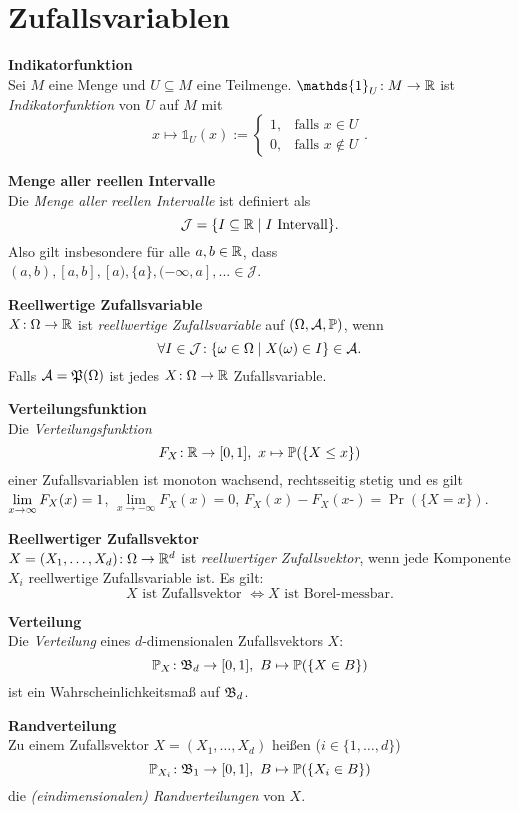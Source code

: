 \section{Zufallsvariablen}
\textbf{Indikatorfunktion}\\
Sei $M$ eine Menge und $U\subseteq M$ eine Teilmenge.
$\mathds{1}_U\!: M\to\R$ ist \textit{Indikatorfunktion} von $U$ auf $M$ mit
\[
  x\mapsto\mathds{1}_U(x):=\begin{cases} 1, & \text{falls }x\in U \\ 0, & \text{falls }x\notin U \end{cases}.
\]

\textbf{Menge aller reellen Intervalle}\\
Die \textit{Menge aller reellen Intervalle} ist definiert als
\[
  \mathcal{J}=\{I\subseteq\mathbb{R} \mid I \text{ Intervall}\}.
\]
Also gilt insbesondere für alle $a,b\in\mathbb{R}$, dass $(a,b),[a,b],[a),\{a\},(-\infty,a],...\in\mathcal{J}$.

\textbf{Reellwertige Zufallsvariable}\\
$X\!: \Omega\to\mathbb{R}$ ist \textit{reellwertige Zufallsvariable} auf $(\Omega,\mathcal{A},\mathbb{P})$,
wenn
\[
  \forall I \in \mathcal{J}\!: \{\omega\in\Omega \mid X(\omega) \in I\} \in \mathcal{A}.
\]
Falls $\mathcal{A} = \mathfrak{P}(\Omega)$ ist jedes $X\!: \Omega\to\mathbb{R}$ Zufallsvariable.

\textbf{Verteilungsfunktion}\\
Die \textit{Verteilungsfunktion}
\[
  F_X\!: \mathbb{R} \to [0,1],\ x \mapsto \mathbb{P}(\{X \leq x\})
\]
einer Zufallsvariablen ist monoton wachsend, rechtsseitig stetig und es gilt\\
$\lim\limits_{x\to\infty} F_X(x) = 1$,
$\lim\limits_{x\to -\infty} F_X(x) = 0$,
$F_X(x) - F_X(x\textbf{-}) = \Pr(\{X = x\})$.

\textbf{Reellwertiger Zufallsvektor}\\
$X = (X_1,\ldots,X_d)\!: \Omega\to\mathbb{R}^d$ ist \textit{reellwertiger Zufallsvektor},
wenn jede Komponente $X_i$ reellwertige Zufallsvariable ist.
Es gilt:\\
\[
  X \text{ ist Zufallsvektor } \Leftrightarrow X \text{ ist Borel-messbar.}
\]

\textbf{Verteilung}\\
Die \textit{Verteilung} eines $d$-dimensionalen Zufallsvektors $X$:
\[
  \mathbb{P}_X\!: \mathfrak{B}_d \to [0,1],\ B \mapsto \mathbb{P}(\{X \in B\})
\]
ist ein Wahrscheinlichkeitsmaß auf $\mathfrak{B}_d$.

\textbf{Randverteilung}\\
Zu einem Zufallsvektor $X = (X_1,\ldots,X_d)$ heißen ($i\in\{1,\ldots,d\}$)
\[
  \mathbb{P}_{X_i}\!: \mathfrak{B}_1 \to [0,1],\ B \mapsto \mathbb{P}(\{X_i \in B\})
\]
die \textit{(eindimensionalen) Randverteilungen} von $X$.

